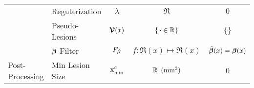 \begin{table}
\begin{tabular}{llccc}
  	                                 & Regularization         &         $\lambda$         &           $\Re$            &            $0$            \\
  	                                 & Pseudo-Lesions         &         $\bm{\mathcal{V}}(x)$          &    $\{\thinspace\cdot\in\mathbb{R}\}$    &          $\{\}$           \\
  	                                 & $\bm{\beta}$ Filter           &         $F_{\bm{\beta}}$         & $f: \Re(x) \mapsto \Re(x)$ & $\tilde{\bm{\beta}}(x) = \bm{\beta}(x)$ \\ \midrule
  	\multirow{1}{*}{Post-Processing} & Min Lesion  Size       &  $\mathrm{x}_{\min}^{c}$  &  $\mathbb{R}\enspace(\text{mm}^{3})$   &            $0$            \\ \bottomrule
  \end{tabular}
\end{table}

